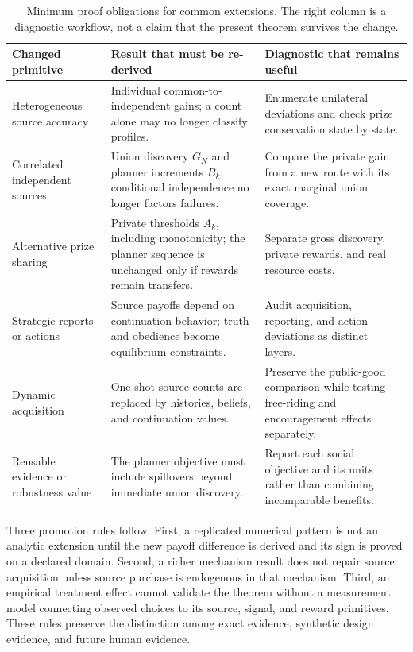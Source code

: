\documentclass[11pt]{article}
\begin{document}
\begin{table}[H]
\centering
\small
\begin{tabularx}{\textwidth}{p{}XX}
\toprule
Changed primitive & Result that must be re-derived & Diagnostic that remains useful\\
\midrule
Heterogeneous source accuracy & Individual common-to-independent gains; a count
alone may no longer classify profiles. & Enumerate unilateral deviations and
check prize conservation state by state.\\
Correlated independent sources & Union discovery $G_N$ and planner increments
$B_k$; conditional independence no longer factors failures. & Compare the
private gain from a new route with its exact marginal union coverage.\\
Alternative prize sharing & Private thresholds $A_k$, including monotonicity;
the planner sequence is unchanged only if rewards remain transfers. & Separate
gross discovery, private rewards, and real resource costs.\\
Strategic reports or actions & Source payoffs depend on continuation behavior;
truth and obedience become equilibrium constraints. & Audit acquisition,
reporting, and action deviations as distinct layers.\\
Dynamic acquisition & One-shot source counts are replaced by histories, beliefs,
and continuation values. & Preserve the public-good comparison while testing
free-riding and encouragement effects separately.\\
Reusable evidence or robustness value & The planner objective must include
spillovers beyond immediate union discovery. & Report each social objective and
its units rather than combining incomparable benefits.\\
\bottomrule
\end{tabularx}
\caption{Minimum proof obligations for common extensions. The right column is a
diagnostic workflow, not a claim that the present theorem survives the change.}
\label{tab:extension-audit}
\end{table}

Three promotion rules follow. First, a replicated numerical pattern is not an
analytic extension until the new payoff difference is derived and its sign is
proved on a declared domain. Second, a richer mechanism result does not repair
source acquisition unless source purchase is endogenous in that mechanism.
Third, an empirical treatment effect cannot validate the theorem without a
measurement model connecting observed choices to its source, signal, and reward
primitives. These rules preserve the distinction among exact evidence,
synthetic design evidence, and future human evidence.
\end{document}
